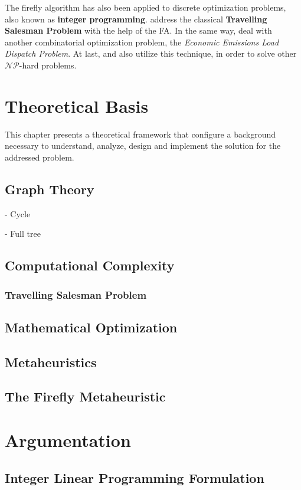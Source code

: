 \documentclass[tuberlin,cic,tc,openright,english,noabntcite,oneside]{iiufrgs}
\begin{document}
The firefly algorithm has also been applied to discrete optimization problems, also known as \textbf{integer programming}. \textcite{jati_evolutionary_2011} address the classical \textbf{Travelling Salesman Problem} with the help of the FA. In the same way, \textcite{apostolopoulos_application_2010} deal with another combinatorial optimization problem, the \emph{Economic Emissions Load Dispatch Problem}. At last, \textcite{sayadi_discrete_2010} and \textcite{sayadi_firefly-inspired_2013} also utilize this technique, in order to solve other $\mathcal{NP}$-hard problems.

\chapter{Theoretical Basis}
This chapter presents a theoretical framework that configure a background necessary to understand, analyze, design and implement the solution for the addressed problem.

\section{Graph Theory}
- Cycle

- Full tree
\section{Computational Complexity}
\subsection{Travelling Salesman Problem}
\section{Mathematical Optimization}


\section{Metaheuristics}
\section{The Firefly Metaheuristic}

\chapter{Argumentation}
\section{Integer Linear Programming Formulation}
\end{document}
